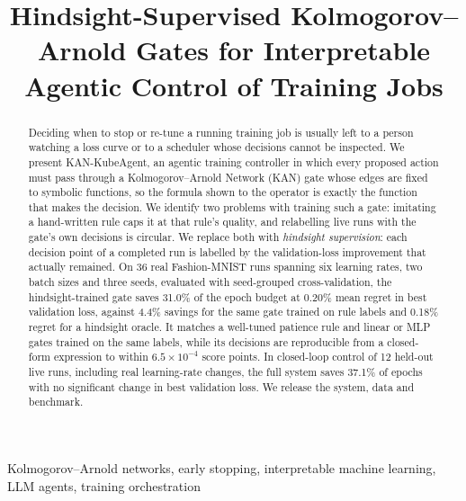 \documentclass[conference]{IEEEtran}
\begin{document}
\title{Hindsight-Supervised Kolmogorov--Arnold Gates for Interpretable Agentic Control of Training Jobs}

\author{
}

\maketitle

\begin{abstract}
Deciding when to stop or re-tune a running training job is usually left to a person watching a loss curve or to a scheduler whose decisions cannot be inspected. We present KAN-KubeAgent, an agentic training controller in which every proposed action must pass through a Kolmogorov--Arnold Network (KAN) gate whose edges are fixed to symbolic functions, so the formula shown to the operator is exactly the function that makes the decision. We identify two problems with training such a gate: imitating a hand-written rule caps it at that rule's quality, and relabelling live runs with the gate's own decisions is circular. We replace both with \emph{hindsight supervision}: each decision point of a completed run is labelled by the validation-loss improvement that actually remained. On 36 real Fashion-MNIST runs spanning six learning rates, two batch sizes and three seeds, evaluated with seed-grouped cross-validation, the hindsight-trained gate saves 31.0\% of the epoch budget at 0.20\% mean regret in best validation loss, against 4.4\% savings for the same gate trained on rule labels and 0.18\% regret for a hindsight oracle. It matches a well-tuned patience rule and linear or MLP gates trained on the same labels, while its decisions are reproducible from a closed-form expression to within $6.5\times10^{-4}$ score points. In closed-loop control of 12 held-out live runs, including real learning-rate changes, the full system saves 37.1\% of epochs with no significant change in best validation loss. We release the system, data and benchmark.
\end{abstract}

\begin{IEEEkeywords}
Kolmogorov--Arnold networks, early stopping, interpretable machine learning, LLM agents, training orchestration
\end{IEEEkeywords}
\end{document}
